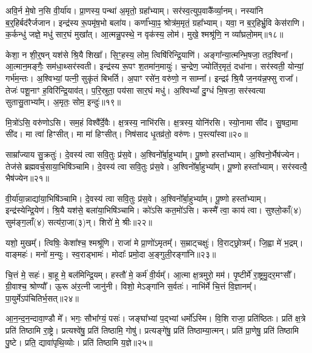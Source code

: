 अवि॒र्न मे॒षो न॒सि वी॒र्या॑य।
प्रा॒णस्य॒ पन्था॑ अ॒मृतो॒ ग्रहा᳚भ्याम्।
सर॑स्व॒त्युप॒वाकै᳚र्व्या॒नम्।
नस्या॑नि ब॒र्॒हिर्बद॑रैर्जजान।
इन्द्र॑स्य रू॒पमृ॑ष॒भो बला॑य।
कर्णा᳚भ्या॒ꣴ॒ श्रोत्र॑म॒मृतं॒ ग्रहा᳚भ्याम्।
यवा॒ न ब॒र्॒हिर्भ्रु॒वि केस॑राणि।
क॒र्कन्धु॑ जज्ञे॒ मधु॑ सार॒घं मुखा᳚त्।
आ॒त्मन्नु॒पस्थे॒ न वृक॑स्य॒ लोम॑।
मुखे॒ श्मश्रू॑णि॒ न व्या᳚घ्रलो॒मम्॥१८॥

केशा॒ न शी॒र्॒षन्‌ यश॑से श्रि॒यै शिखा᳚।
सि॒ꣳ॒हस्य॒ लोम॒ त्विषि॑रिन्द्रि॒याणि॑।
अङ्गा᳚न्या॒त्मन्भि॒षजा॒ तद॒श्विना᳚।
आ॒त्मान॒मङ्गैः॒ सम॑धा॒थ्सर॑स्वती।
इन्द्र॑स्य रू॒पꣳ श॒तमा॑न॒मायुः॑।
च॒न्द्रेण॒ ज्योति॑र॒मृतं॒ दधा॑ना।
सर॑स्वती॒ योन्यां॒ गर्भ॑म॒न्तः।
अ॒श्विभ्यां॒ पत्नी॒ सुकृ॑तं बिभर्ति।
अ॒पाꣳ रसे॑न॒ वरु॑णो॒ न साम्ना᳚।
इन्द्रꣴ॑ श्रि॒यै ज॒नय॑न्न॒फ्सु राजा᳚।
तेजः॑ पशू॒नाꣳ ह॒विरि॑न्द्रि॒याव॑त्।
प॒रि॒स्रुता॒ पय॑सा सार॒घं मधु॑।
अ॒श्विभ्यां᳚ दु॒ग्धं भि॒षजा॒ सर॑स्वत्या सुतासु॒ताभ्या᳚म्।
अ॒मृतः॒ सोम॒ इन्दुः॑॥१९॥\anuvakamend[अन्त॑र आ॒राद॒न्तर्व॑साते व्याघ्रलो॒मꣳ राजा॑ च॒त्वारि॑ च]

मि॒त्रो॑ऽसि॒ वरु॑णोऽसि।
सम॒हं विश्वै᳚र्दे॒वैः।
क्ष॒त्रस्य॒ नाभि॑रसि।
क्ष॒त्रस्य॒ योनि॑रसि।
स्यो॒नामा सी॑द।
सु॒षदा॒मा सी॑द।
मा त्वा॑ हिꣳसीत्।
मा मा॑ हिꣳसीत्।
निष॑साद धृ॒तव्र॑तो॒ वरु॑णः।
प॒स्त्या᳚स्वा॥२०॥

साम्रा᳚ज्याय सु॒क्रतुः॑।
दे॒वस्य॑ त्वा सवि॒तुः प्र॑स॒वे।
अ॒श्विनो᳚र्बा॒हुभ्या᳚म्।
पू॒ष्णो हस्ता᳚भ्याम्।
अ॒श्विनो॒र्भैष॑ज्येन।
तेज॑से ब्रह्मवर्च॒साया॒भिषि॑ञ्चामि।
दे॒वस्य॑ त्वा सवि॒तुः प्र॑स॒वे।
अ॒श्विनो᳚र्बा॒हुभ्या᳚म्।
पू॒ष्णो हस्ता᳚भ्याम्।
सर॑स्वत्यै॒ भैष॑ज्येन॥२१॥

वी॒र्या॑या॒न्नाद्या॑या॒भिषि॑ञ्चामि।
दे॒वस्य॑ त्वा सवि॒तुः प्र॑स॒वे।
अ॒श्विनो᳚र्बा॒हुभ्या᳚म्।
पू॒ष्णो हस्ता᳚भ्याम्।
इन्द्र॑स्येन्द्रि॒येण॑।
श्रि॒यै यश॑से॒ बला॑या॒भिषि॑ञ्चामि।
को॑ऽसि कत॒मो॑ऽसि।
कस्मै᳚ त्वा॒ काय॑ त्वा।
सुश्लो॒काँ(४) सुम॑ङ्ग॒लाँ(४) सत्य॑रा॒जा(३)न्।
शिरो॑ मे॒ श्रीः॥२२॥

यशो॒ मुखम्᳚।
त्विषिः॒ केशा᳚श्च॒ श्मश्रू॑णि।
राजा॑ मे प्रा॒णो॑\-ऽमृतम्᳚।
स॒म्राट्चक्षुः॑।
वि॒राट्छ्रोत्रम्᳚।
जि॒ह्वा मे॑ भ॒द्रम्।
वाङ्महः॑।
मनो॑ म॒न्युः।
स्व॒राड्भामः॑।
मोदाः᳚ प्रमो॒दा अ॒ङ्गुली॒रङ्गा॑नि॥२३॥

चि॒त्तं मे॒ सहः॑।
बा॒हू मे॒ बल॑मिन्द्रि॒यम्।
हस्तौ॑ मे॒ कर्म॑ वी॒र्यम्᳚।
आ॒त्मा क्ष॒त्रमुरो॒ मम॑।
पृ॒ष्टीर्मे॑ रा॒ष्ट्रमु॒दर॒मꣳसौ᳚।
ग्री॒वाश्च॒ श्रोण्यौ᳚।
ऊ॒रू अ॑र॒त्नी जानु॑नी।
विशो॒ मेऽङ्गा॑नि स॒र्वतः॑।
नाभि॑र्मे चि॒त्तं वि॒ज्ञानम्᳚।
पा॒युर्मे\-ऽप॑चितिर्भ॒सत्॥२४॥

आ॒न॒न्द॒न॒न्दावा॒ण्डौ मे᳚।
भगः॒ सौभा᳚ग्यं॒ पसः॑।
जङ्घा᳚भ्यां प॒द्भ्यां धर्मो᳚\-ऽस्मि।
वि॒शि राजा॒ प्रति॑\-ष्ठितः।
प्रति॑ क्ष॒त्रे प्रति॑ तिष्ठामि रा॒ष्ट्रे।
प्रत्यश्वे॑षु॒ प्रति॑ तिष्ठामि॒ गोषु॑।
प्रत्यङ्गे॑षु॒ प्रति॑ तिष्ठाम्या॒त्मन्।
प्रति॑ प्रा॒णेषु॒ प्रति॑ तिष्ठामि पु॒ष्टे।
प्रति॒ द्यावा॑पृथि॒व्योः।
प्रति॑ तिष्ठामि य॒ज्ञे॥२५॥

